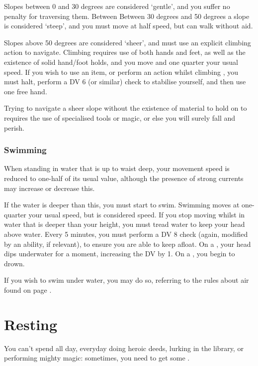 Slopes between 0 and 30 degrees are considered `gentle', and you suffer no penalty for traversing them. Between  Between 30 degrees and 50 degrees a slope is considered `steep', and you must move at half speed, but can walk without aid. 

Slopes above 50 degrees are considered `sheer', and must use an explicit climbing action to navigate. Climbing requires use of both hands and feet, as well as the existence of solid hand/foot holds, and you move and one quarter your usual speed. If you wish to use an item, or perform an action whilst climbing , you must halt, perform a DV 6  (or similar) check to stabilise yourself, and then use one free hand. 

Trying to navigate a sheer slope without the existence of material to hold on to requires the use of specialised tools or magic, or else you will surely fall and perish. 

\subsubsection{Swimming}

When standing in water that is up to waist deep, your movement speed is reduced to one-half of its usual value, although the presence of strong currents may increase or decrease this. 

If the water is deeper than this, you must start to swim. Swimming moves at one-quarter your usual speed, but is considered  speed. If you stop moving whilst in water that is deeper than your height, you must tread water to keep your head above water. Every 5 minutes, you must perform a DV 8  check (again, modified by an ability, if relevant), to ensure you are able to keep afloat. On a , your head dips underwater for a moment, increasing the DV by 1. On a , you begin to drown.

If you wish to swim under water, you may do so, referring to the rules about air found on page \pageref{S:Air}. 



\section{Resting}

You can't spend all day, everyday doing heroic deeds, lurking in the library, or performing mighty magic: sometimes, you need to get some . 

